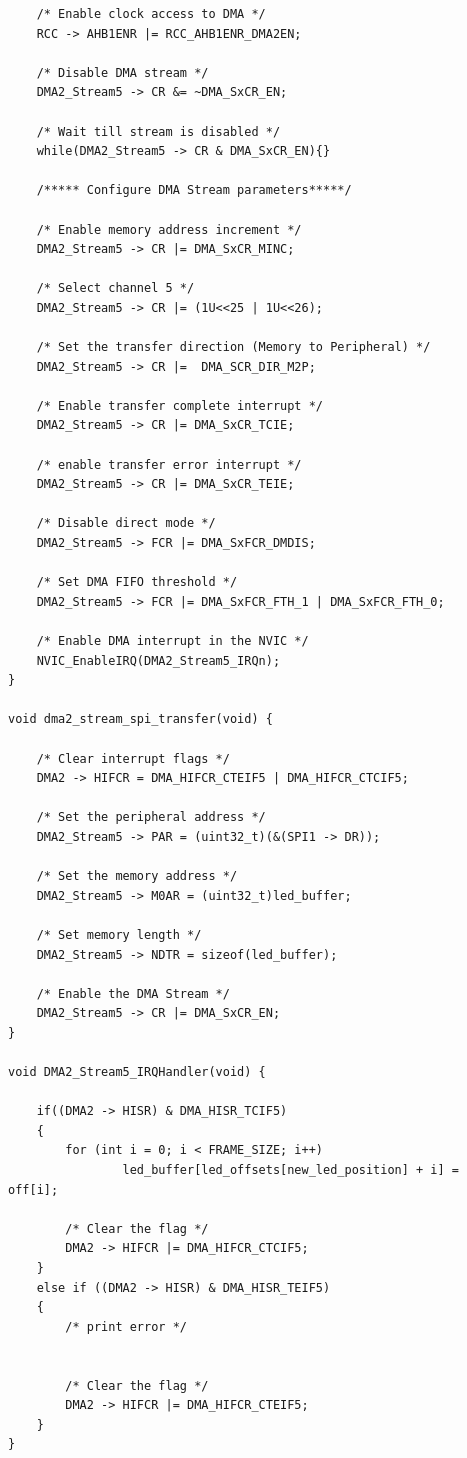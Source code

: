 \documentclass[12pt]{article}
\numberwithin{subsubsubsection}{subsubsection}
\begin{document}
\begin{verbatim}
    /* Enable clock access to DMA */
    RCC -> AHB1ENR |= RCC_AHB1ENR_DMA2EN;
    
    /* Disable DMA stream */
    DMA2_Stream5 -> CR &= ~DMA_SxCR_EN;
    
    /* Wait till stream is disabled */
    while(DMA2_Stream5 -> CR & DMA_SxCR_EN){}
    
    /***** Configure DMA Stream parameters*****/
    
    /* Enable memory address increment */
    DMA2_Stream5 -> CR |= DMA_SxCR_MINC;
    
    /* Select channel 5 */
    DMA2_Stream5 -> CR |= (1U<<25 | 1U<<26);
    
    /* Set the transfer direction (Memory to Peripheral) */
    DMA2_Stream5 -> CR |=  DMA_SCR_DIR_M2P;
    
    /* Enable transfer complete interrupt */
    DMA2_Stream5 -> CR |= DMA_SxCR_TCIE;
    
    /* enable transfer error interrupt */
    DMA2_Stream5 -> CR |= DMA_SxCR_TEIE;
    
    /* Disable direct mode */
    DMA2_Stream5 -> FCR |= DMA_SxFCR_DMDIS;
    
    /* Set DMA FIFO threshold */
    DMA2_Stream5 -> FCR |= DMA_SxFCR_FTH_1 | DMA_SxFCR_FTH_0;
    
    /* Enable DMA interrupt in the NVIC */
    NVIC_EnableIRQ(DMA2_Stream5_IRQn);
}

void dma2_stream_spi_transfer(void) {
	
    /* Clear interrupt flags */
    DMA2 -> HIFCR = DMA_HIFCR_CTEIF5 | DMA_HIFCR_CTCIF5;
    
    /* Set the peripheral address */
    DMA2_Stream5 -> PAR = (uint32_t)(&(SPI1 -> DR));
    
    /* Set the memory address */
    DMA2_Stream5 -> M0AR = (uint32_t)led_buffer;
    
    /* Set memory length */
    DMA2_Stream5 -> NDTR = sizeof(led_buffer);
    
    /* Enable the DMA Stream */
    DMA2_Stream5 -> CR |= DMA_SxCR_EN;
}

void DMA2_Stream5_IRQHandler(void) {
	
    if((DMA2 -> HISR) & DMA_HISR_TCIF5)
    {
        for (int i = 0; i < FRAME_SIZE; i++)
                led_buffer[led_offsets[new_led_position] + i] = off[i];
        
        /* Clear the flag */
        DMA2 -> HIFCR |= DMA_HIFCR_CTCIF5;
    }
    else if ((DMA2 -> HISR) & DMA_HISR_TEIF5)
    {
        /* print error */
    
    
        /* Clear the flag */
        DMA2 -> HIFCR |= DMA_HIFCR_CTEIF5;
    }
}

\end{verbatim}
\newpage
\end{document}
